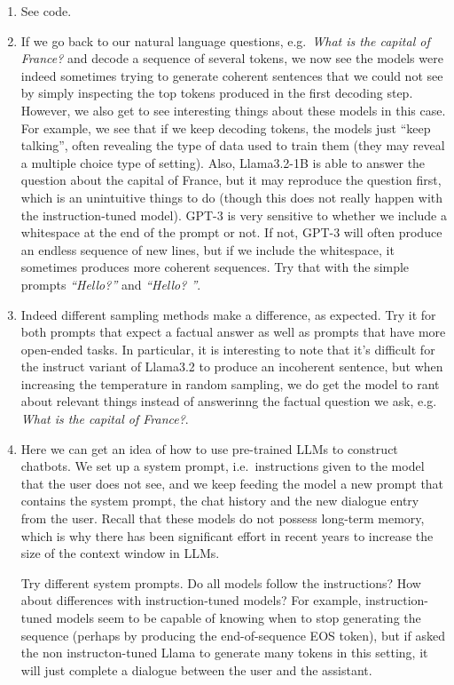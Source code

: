 \documentclass[11pt,a4paper]{article}
\begin{document}
\begin{enumerate}[label=(\alph*)]
    \item See code.
    \item If we go back to our natural language questions, e.g.\
          \emph{What is the capital of France?} and decode a sequence of several
          tokens, we now see the models were indeed sometimes trying to generate
          coherent sentences that we could not see by simply inspecting the top
          tokens produced in the first decoding step.
          However, we also get to see interesting things about these models in
          this case.
          For example, we see that if we keep decoding tokens, the models just
          ``keep talking'', often revealing the type of data used to train them
          (they may reveal a multiple choice type of setting).
          Also, Llama3.2-1B is able to answer the question about the capital of
          France, but it may reproduce the question first, which is an
          unintuitive things to do (though this does not really happen with
          the instruction-tuned model).
          GPT-3 is very sensitive to whether we include a whitespace at the end
          of the prompt or not.
          If not, GPT-3 will often produce an endless sequence of new lines, but
          if we include the whitespace, it sometimes produces more coherent
          sequences. Try that with the simple prompts \emph{``Hello?''} and
          \emph{``Hello? ''}.
    \item Indeed different sampling methods make a difference, as expected.
          Try it for both prompts that expect a factual answer as well as
          prompts that have more open-ended tasks.
          In particular, it is interesting to note that it's difficult for the
          instruct variant of Llama3.2 to produce an incoherent sentence, but
          when increasing the temperature in random sampling, we do get the
          model to rant about relevant things instead of answerinng the
          factual question we ask, e.g. \emph{What is the capital of France?}.
    \item Here we can get an idea of how to use pre-trained LLMs to construct
          chatbots. We set up a system prompt, i.e.\ instructions given to the 
          model that the user does not see, and we keep feeding the model a 
          new prompt that contains the system prompt, the chat history and the 
          new dialogue entry from the user. 
          Recall that these models do not possess long-term memory, which is why
          there has been significant effort in recent years to increase the size
          of the context window in LLMs.
          
          Try different system prompts. Do all models follow the instructions?
          How about differences with instruction-tuned models?
          For example, instruction-tuned models seem to be capable of knowing 
          when to stop generating the sequence (perhaps by producing the 
          end-of-sequence EOS token), but if asked the non instructon-tuned 
          Llama to generate many tokens in this setting, it will just complete 
          a dialogue between the user and the assistant.
\end{enumerate}
\end{document}
